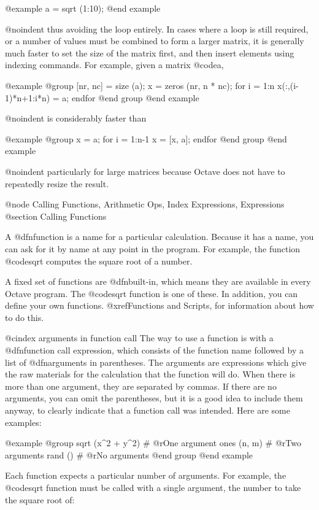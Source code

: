 @example
a = sqrt (1:10);
@end example

@noindent
thus avoiding the loop entirely.  In cases where a loop is still
required, or a number of values must be combined to form a larger
matrix, it is generally much faster to set the size of the matrix first,
and then insert elements using indexing commands.  For example, given a
matrix @code{a},

@example
@group
[nr, nc] = size (a);
x = zeros (nr, n * nc);
for i = 1:n
  x(:,(i-1)*n+1:i*n) = a;
endfor
@end group
@end example

@noindent
is considerably faster than

@example
@group
x = a;
for i = 1:n-1
  x = [x, a];
endfor
@end group
@end example

@noindent
particularly for large matrices because Octave does not have to
repeatedly resize the result.

@node Calling Functions, Arithmetic Ops, Index Expressions, Expressions
@section Calling Functions

A @dfn{function} is a name for a particular calculation.  Because it has
a name, you can ask for it by name at any point in the program.  For
example, the function @code{sqrt} computes the square root of a number.

A fixed set of functions are @dfn{built-in}, which means they are
available in every Octave program.  The @code{sqrt} function is one of
these.  In addition, you can define your own functions.
@xref{Functions and Scripts}, for information about how to do this.

@cindex arguments in function call
The way to use a function is with a @dfn{function call} expression,
which consists of the function name followed by a list of
@dfn{arguments} in parentheses. The arguments are expressions which give
the raw materials for the calculation that the function will do.  When
there is more than one argument, they are separated by commas.  If there
are no arguments, you can omit the parentheses, but it is a good idea to
include them anyway, to clearly indicate that a function call was
intended.  Here are some examples:

@example
@group
sqrt (x^2 + y^2)      # @r{One argument}
ones (n, m)           # @r{Two arguments}
rand ()               # @r{No arguments}
@end group
@end example

Each function expects a particular number of arguments.  For example, the
@code{sqrt} function must be called with a single argument, the number
to take the square root of:

